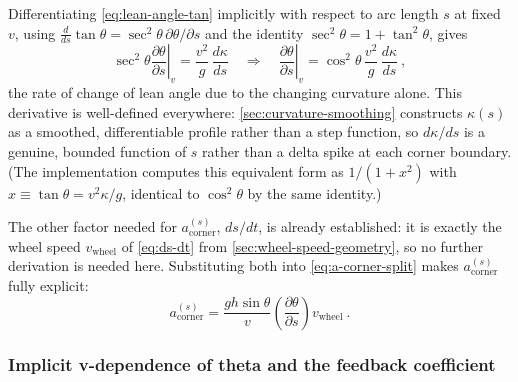 Differentiating \cref{eq:lean-angle-tan} implicitly with respect to arc length
$s$ at fixed $v$, using $\frac{d}{ds}\tan\theta = \sec^2\theta\,
\partial\theta/\partial s$ and the identity $\sec^2\theta = 1+\tan^2\theta$,
gives
\begin{equation}
    \sec^2\theta\left.\frac{\partial\theta}{\partial s}\right|_{v} =
        \frac{v^2}{g}\,\frac{d\kappa}{ds}
    \quad\Longrightarrow\quad
    \left.\frac{\partial\theta}{\partial s}\right|_{v} =
        \cos^2\theta\,\frac{v^2}{g}\,\frac{d\kappa}{ds}\ ,
    \label{eq:dtheta-ds}
\end{equation}
the rate of change of lean angle due to the changing curvature alone. This
derivative is well-defined everywhere: \cref{sec:curvature-smoothing} constructs
$\kappa(s)$ as a smoothed, differentiable profile rather than a step function,
so $d\kappa/ds$ is a genuine, bounded function of $s$ rather than a delta spike
at each corner boundary. (The implementation computes this equivalent form as
$1/(1+x^2)$ with
$x \equiv \tan\theta = v^2\kappa/g$, identical to $\cos^2\theta$ by the same
identity.)

The other factor needed for $a_{\mathrm{corner}}^{(s)}$, $ds/dt$, is already
established: it is exactly the wheel speed $v_{\mathrm{wheel}}$ of
\cref{eq:ds-dt} from \cref{sec:wheel-speed-geometry}, so no further derivation
is needed here. Substituting both into \cref{eq:a-corner-split} makes
$a_{\mathrm{corner}}^{(s)}$ fully explicit:
\begin{equation}
    a_{\mathrm{corner}}^{(s)} =
        \frac{gh\sin\theta}{v}\left(\frac{\partial\theta}{\partial s}\right)v_{\mathrm{wheel}}\ .
    \label{eq:a-corner-s}
\end{equation}

\subsubsection{Implicit v-dependence of theta and the feedback coefficient}

